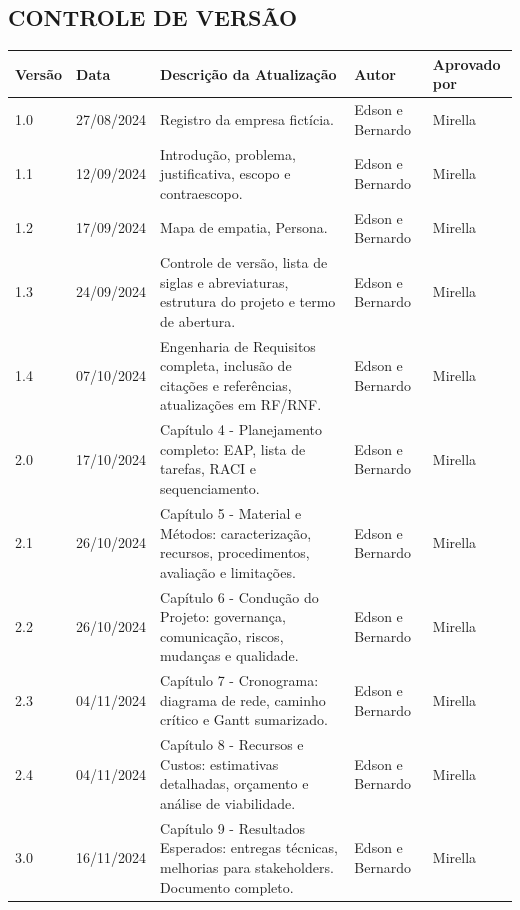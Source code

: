 \begin{center}
\Large
\section*{CONTROLE DE VERSÃO}
\end{center}

\begin{center}
\scriptsize
\begin{tabular}{|p{1.2cm}|p{1.7cm}|p{5.3cm}|p{2.1cm}|p{1.7cm}|}
\hline
\textbf{Versão} & \textbf{Data} & \textbf{Descrição da Atualização} & \textbf{Autor} & \textbf{Aprovado por} \\ \hline
1.0 & 27/08/2024 & Registro da empresa fictícia. & Edson e Bernardo & Mirella \\ \hline
1.1 & 12/09/2024 & Introdução, problema, justificativa, escopo e contraescopo. & Edson e Bernardo & Mirella \\ \hline
1.2 & 17/09/2024 & Mapa de empatia, Persona. & Edson e Bernardo & Mirella \\ \hline
1.3 & 24/09/2024 & Controle de versão, lista de siglas e abreviaturas, estrutura do projeto e termo de abertura. & Edson e Bernardo & Mirella \\ \hline
1.4 & 07/10/2024 & Engenharia de Requisitos completa, inclusão de citações e referências, atualizações em RF/RNF. & Edson e Bernardo & Mirella \\ \hline
2.0 & 17/10/2024 & Capítulo 4 - Planejamento completo: EAP, lista de tarefas, RACI e sequenciamento. & Edson e Bernardo & Mirella \\ \hline
2.1 & 26/10/2024 & Capítulo 5 - Material e Métodos: caracterização, recursos, procedimentos, avaliação e limitações. & Edson e Bernardo & Mirella \\ \hline
2.2 & 26/10/2024 & Capítulo 6 - Condução do Projeto: governança, comunicação, riscos, mudanças e qualidade. & Edson e Bernardo & Mirella \\ \hline
2.3 & 04/11/2024 & Capítulo 7 - Cronograma: diagrama de rede, caminho crítico e Gantt sumarizado. & Edson e Bernardo & Mirella \\ \hline
2.4 & 04/11/2024 & Capítulo 8 - Recursos e Custos: estimativas detalhadas, orçamento e análise de viabilidade. & Edson e Bernardo & Mirella \\ \hline
3.0 & 16/11/2024 & Capítulo 9 - Resultados Esperados: entregas técnicas, melhorias para stakeholders. Documento completo. & Edson e Bernardo & Mirella \\ \hline
\end{tabular}
\end{center}
